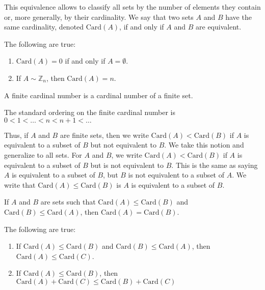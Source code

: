         This equivalence allows to classify all sets by the
        number of elements they contain or, more generally,
        by their cardinality. We say that two sets $A$ and
        $B$ have the same cardinality, denoted
        $\mathrm{Card}(A)$, if and only if $A$ and $B$ are equivalent.
        \begin{theorem}
            The following are true:
            \begin{enumerate}
                \item $\mathrm{Card}(A)=0$ if and only if $A=\emptyset$.
                \item If ${A}\sim{\mathbb{Z}_{n}}$,
                      then $\mathrm{Card}(A)=n$.
            \end{enumerate}
        \end{theorem}
        \begin{definition}
            A finite cardinal number is a cardinal
            number of a finite set.
        \end{definition}
        \begin{definition}
            The standard ordering on the finite cardinal
            number is $0<1<\hdots<n<n+1<\hdots$
        \end{definition}
        Thus, if $A$ and $B$ are finite sets, then we write
        $\mathrm{Card}(A)<\mathrm{Card}(B)$ if $A$ is equivalent to a
        subset of $B$ but not equivalent to $B$.
        We take this notion and generalize to
        all sets. For $A$ and $B$, we write
        $\mathrm{Card}(A)<\mathrm{Card}(B)$ if $A$ is equivalent to a subset
        of $B$ but is not equivalent to $B$. This is the
        same as saying $A$ is equivalent to a subset of $B$,
        but $B$ is not equivalent to a subset of $A$.
        We write that
        $\mathrm{Card}(A)\leq\mathrm{Card}(B)$ is $A$ is equivalent to a
        subset of $B$.
        \begin{theorem}
            If $A$ and $B$ are sets such that
            $\mathrm{Card}(A)\leq\mathrm{Card}(B)$ and
            $\mathrm{Card}(B)\leq\mathrm{Card}(A)$, then
            $\mathrm{Card}(A)=\mathrm{Card}(B)$.
        \end{theorem}
        \begin{theorem}
            The following are true:
            \begin{enumerate}
                \item If $\mathrm{Card}(A)\leq\mathrm{Card}(B)$ and
                      $\mathrm{Card}(B)\leq\mathrm{Card}(A)$, then
                      $\mathrm{Card}(A)\leq\mathrm{Card}(C)$.
                \item If $\mathrm{Card}(A)\leq\mathrm{Card}(B)$, then
                      $\mathrm{Card}(A)+\mathrm{Card}(C)\leq\mathrm{Card}(B)+\mathrm{Card}(C)$
            \end{enumerate}
        \end{theorem}
